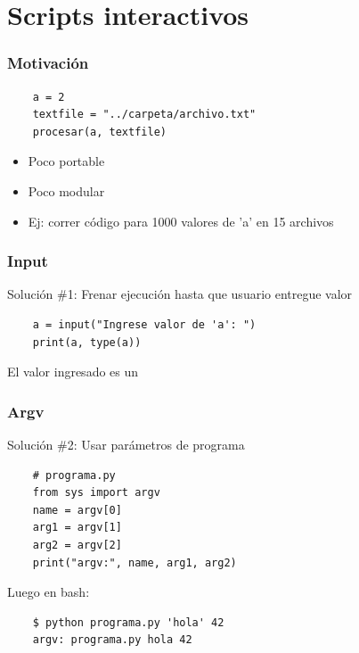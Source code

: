 \documentclass[14pt,aspectratio=169,xcolor=dvipsnames]{beamer}
\begin{document}
\section{Scripts interactivos}
\begin{frame}[fragile]\frametitle{Motivación}
    \begin{verbatim}
    a = 2
    textfile = "../carpeta/archivo.txt"
    procesar(a, textfile)
    \end{verbatim}
    \begin{itemize}
        \item Poco portable
        \item Poco modular
        \item Ej: correr código para 1000 valores de 'a' en 15 archivos
    \end{itemize}

\pause {}
\end{frame}
\begin{frame}[fragile]\frametitle{Input}
    Solución \#1: Frenar ejecución hasta que usuario entregue valor
    
    \begin{verbatim}
    a = input("Ingrese valor de 'a': ")
    print(a, type(a))
    \end{verbatim}

    \vspace{1cm}
    El valor ingresado es un 
\end{frame}
\begin{frame}[fragile]\frametitle{Argv}
    Solución \#2: Usar parámetros de programa
    \begin{verbatim}
    # programa.py
    from sys import argv
    name = argv[0]
    arg1 = argv[1]
    arg2 = argv[2]
    print("argv:", name, arg1, arg2)
    \end{verbatim}

    Luego en bash:
    \begin{verbatim}
    $ python programa.py 'hola' 42
    argv: programa.py hola 42
    \end{verbatim}
\end{frame}
\begin{frame}


\end{frame}
\end{document}
